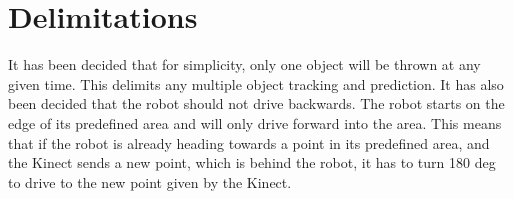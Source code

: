 \section{Delimitations}
\label{sec:Delimitations}
It has been decided that for simplicity, only one object will be thrown at any given time. This delimits any multiple object tracking and prediction. \newline
It has also been decided that the robot should not drive backwards. The robot starts on the edge of its predefined area and will only drive forward into the area. This means that if the robot is already heading towards a point in its predefined area, and the Kinect sends a new point, which is behind the robot, it has to turn 180 deg to drive to the new point given by the Kinect. 

